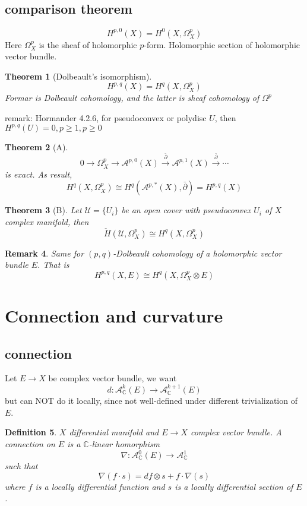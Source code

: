 \documentclass{article}
\newtheorem{definition}{Definition}[subsection]
\newtheorem{theorem}[definition]{Theorem}
\newtheorem{remark}[definition]{Remark}
\begin{document}
\subsection{comparison theorem}
\[
  H^{p,0}(X)=H^{0}(X,\Omega^{p}_{X})
\]
Here $\Omega^{p}_{X}$ is the sheaf of holomorphic $p$-form. Holomorphic section of holomorphic vector bundle.
\begin{theorem}[Dolbeault's isomorphism]
  \[
  H^{p,q}(X)=H^{q}(X,\Omega^{p}_{X})
  \]
Formar is Dolbeault cohomology, and the latter is sheaf cohomology of $\Omega^{p}$
\end{theorem}
remark: Hormander 4.2.6, for pseudoconvex or polydisc $U$, then $H^{p,q}(U)=0,p\geqslant 1, p\geqslant 0$
\begin{theorem}[A]
  \[
    0\to\Omega^{p}_{X}\to \mathcal{A}^{p,0}(X)\xrightarrow{ \bar{\partial}} \mathcal{A}^{p,1}(X)\xrightarrow{ \bar{\partial}} \cdots
  \]
  is exact. As result,
  \[
    H^{q}(X,\Omega^{p}_{X})\cong H^{q}(\mathcal{A}^{p,*}(X), \bar{\partial})=H^{p,q}(X)
  \]
\end{theorem}
\begin{theorem}[B]
  Let $\mathcal{U}=\{U_{i}\} $ be an open cover with pseudoconvex $U_{i}$  of $X$ complex manifold, then
  \[
    \check{H}(\mathcal{U},\Omega^{p}_{X})\cong H^{q}(X,\Omega^{p}_{X})
  \]
\end{theorem}
\begin{remark}
  Same for $(p,q)$-Dolbeault cohomology of a holomorphic vector bundle $E$. That is
  \[
    H^{p,q}(X,E)\cong H^{q}(X,\Omega^{p}_{X} \otimes E)
  \]
\end{remark}
\section{Connection and curvature}
\subsection{connection}

Let $E\to X$ be complex vector bundle, we want
\[
  d:\mathcal{A}_{\mathbb{C}}^{k}(E)\to \mathcal{A}_{\mathbb{C}}^{k+1}(E)
\]
but can NOT do it locally, since not well-defined under different trivialization of $E$. 
\begin{definition}
  $X$ differential manifold and $E\to X$ complex vector bundle. A connection on $E$ is a $\mathbb{C}$-linear homorphism
  \[
    \nabla: \mathcal{A}^{0}_{\mathbb{C}}(E)\to \mathcal{A}_{\mathbb{C}}^{1}
  \]
  such that
  \[
    \nabla (f \cdot s)=df \otimes s + f\cdot \nabla(s)
  \]
  where $f$ is a locally differential function and $s$ is a locally differential section of $E$.   
\end{definition}
\end{document}
